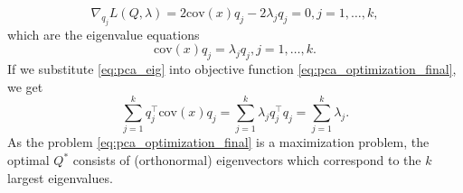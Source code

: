 \begin{equation}
    \nabla_{q_j}L(Q,\lambda) = 2 \text{cov}(x)q_j-2\lambda_jq_j=0, j=1,\dots,k,
\end{equation}
which are the eigenvalue equations
\begin{equation}
    \text{cov}(x)q_j=\lambda_j q_j, j=1,\dots,k.
    \label{eq:pca_eig}
\end{equation}
If we substitute \eqref{eq:pca_eig} into objective function \eqref{eq:pca_optimization_final}, we get
\begin{equation}
    \sum_{j=1}^k q_j^{\top} \text{cov}(x)q_j = \sum_{j=1}^k \lambda_j q_j^{\top}q_j = \sum_{j=1}^k \lambda_j.
\end{equation}
As the problem \eqref{eq:pca_optimization_final} is a maximization problem, the optimal $Q^*$ consists of (orthonormal) eigenvectors which correspond to the $k$ largest eigenvalues.
